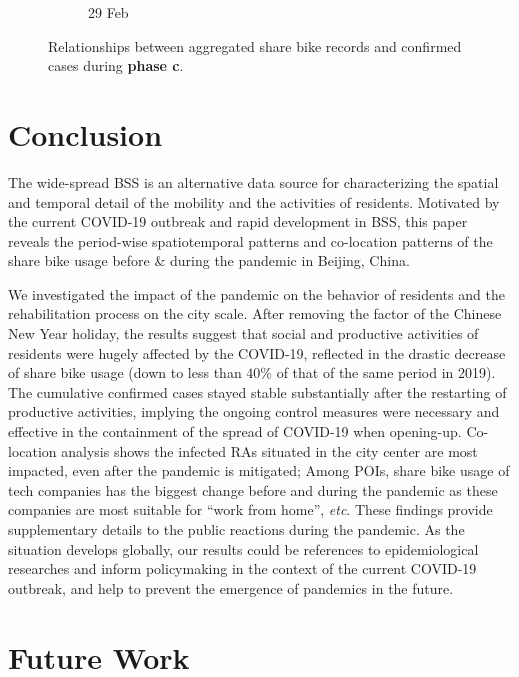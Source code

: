 \documentclass[ijgi,submit,moreauthors,pdftex]{Definitions/mdpi}
\begin{document}
\begin{figure}[!ht]
\begin{subfigure}{.3\textwidth}
\begin{tikzpicture}[inner sep = 0pt]
        \end{tikzpicture}
        \caption{29 Feb}
        \label{fig:correlation_02_29}
    \end{subfigure}
    \caption{Relationships between aggregated share bike records and confirmed cases during \textbf{phase c}.}
    \label{fig:BSS_phase_3}
\end{figure}


\section{Conclusion}\label{sec:conclusion}
The wide-spread BSS is an alternative data source for characterizing the spatial and temporal detail of the mobility and the activities of residents.
Motivated by the current COVID-19 outbreak and rapid development in BSS, this paper reveals the period-wise spatiotemporal patterns and co-location patterns of the share bike usage before \& during the pandemic in Beijing, China.

We investigated the impact of the pandemic on the behavior of residents and the rehabilitation process on the city scale.
After removing the factor of the Chinese New Year holiday, the results suggest that social and productive activities of residents were hugely affected by the COVID-19, reflected in the drastic decrease of share bike usage (down to less than $40\%$ of that of the same period in 2019). 
The cumulative confirmed cases stayed stable substantially after the restarting of productive activities, implying the ongoing control measures were necessary and effective in the containment of the spread of COVID-19 when opening-up.
Co-location analysis shows the infected RAs situated in the city center are most impacted, even after the pandemic is mitigated;
Among POIs, share bike usage of tech companies has the biggest change before and during the pandemic as these companies are most suitable for ``work from home'', \textit{etc}.
These findings provide supplementary details to the public reactions during the pandemic.
As the situation develops globally, our results could be references to epidemiological researches and inform policymaking in the context of the current COVID-19 outbreak, and help to prevent the emergence of pandemics in the future.
\section{Future Work}\label{sec:future}
\end{document}
